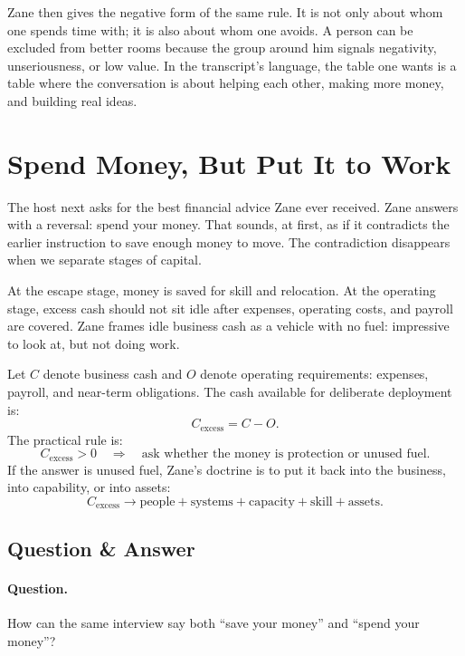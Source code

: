 Zane then gives the negative form of the same rule. It is not only about whom one spends time with; it is also about whom one avoids. A person can be excluded from better rooms because the group around him signals negativity, unseriousness, or low value. In the transcript's language, the table one wants is a table where the conversation is about helping each other, making more money, and building real ideas.

\section{Spend Money, But Put It to Work}

The host next asks for the best financial advice Zane ever received. Zane answers with a reversal: spend your money. That sounds, at first, as if it contradicts the earlier instruction to save enough money to move. The contradiction disappears when we separate stages of capital.

At the escape stage, money is saved for skill and relocation. At the operating stage, excess cash should not sit idle after expenses, operating costs, and payroll are covered. Zane frames idle business cash as a vehicle with no fuel: impressive to look at, but not doing work.

Let \(C\) denote business cash and \(O\) denote operating requirements: expenses, payroll, and near-term obligations. The cash available for deliberate deployment is:
\begin{equation}
C_{\mathrm{excess}}=C-O.
\end{equation}
The practical rule is:
\begin{equation}
C_{\mathrm{excess}}>0
\quad\Longrightarrow\quad
\text{ask whether the money is protection or unused fuel}.
\end{equation}
If the answer is unused fuel, Zane's doctrine is to put it back into the business, into capability, or into assets:
\begin{equation}
C_{\mathrm{excess}}
\longrightarrow
\text{people}+\text{systems}+\text{capacity}+\text{skill}+\text{assets}.
\end{equation}

\subsection{Question \& Answer}

\paragraph{Question.}
How can the same interview say both ``save your money'' and ``spend your money''?

